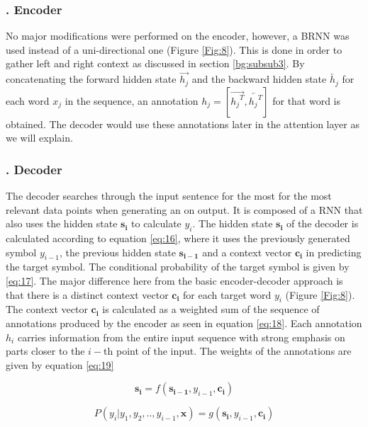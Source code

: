 \subsubsection{. Encoder} 
\label{bg:s4_sub2_subsub1}
No major modifications were performed on the encoder, however, a \ac{BRNN} was used instead of a uni-directional one (Figure \ref{Fig:8}). This is done in order to gather left and right context as discussed in section \ref{bg:subsub3}. By concatenating the forward hidden state $ {\overrightarrow{{h_j}}}$ and the backward hidden state $ {\overleftarrow{{h_j}}}$ for each word $x_j$ in the sequence, an annotation ${h_j}=[{\overrightarrow{{{h_j}^T}}}, {\overleftarrow{{{h_j}^T}}}] $ for that word is obtained. The decoder would use these annotations later in the attention layer as we will explain.

\subsubsection{. Decoder} 
\label{bg:s4_sub2_subsub2}

The decoder searches through the input sentence for the most for the most relevant data points when generating an on output. It is composed of a  \ac{RNN} that also uses the hidden state $ \mathbf{s_i}$ to calculate $ y_i$. The hidden state $ \mathbf{s_i}$ of the decoder is calculated according to equation \ref{eq:16}, where it uses the previously generated symbol $y_{i-1}$, the previous hidden state $\mathbf{s_{i-1}}$ and a context vector $\mathbf{c_i}$ in predicting the target symbol. The conditional probability of the target symbol is given by \ref{eq:17}. The major difference here from the basic encoder-decoder approach is that there is a distinct context vector $\mathbf{c_i}$ for each target word $y_i$ (Figure \ref{Fig:8}). The context vector $\mathbf{c_i}$ is calculated as a weighted sum of the sequence of annotations produced by the encoder as seen in equation \ref{eq:18}. Each annotation $h_i$ carries information from the entire input sequence with strong emphasis on parts closer to the $i-$th point of the input. The weights of the annotations are given by equation \ref{eq:19}


\begin{equation}
\label{eq:16}
\mathbf{s_i} = f(\mathbf{s_{i-1}}, y_{i-1}, \mathbf{c_i})
\end{equation}

\begin{equation}
\label{eq:17}
P(y_i | y_1, y_2,.., y_{i-1}, \mathbf{x}) = g(\mathbf{s_{i}}, y_{i-1}, \mathbf{c_i})
\end{equation}

